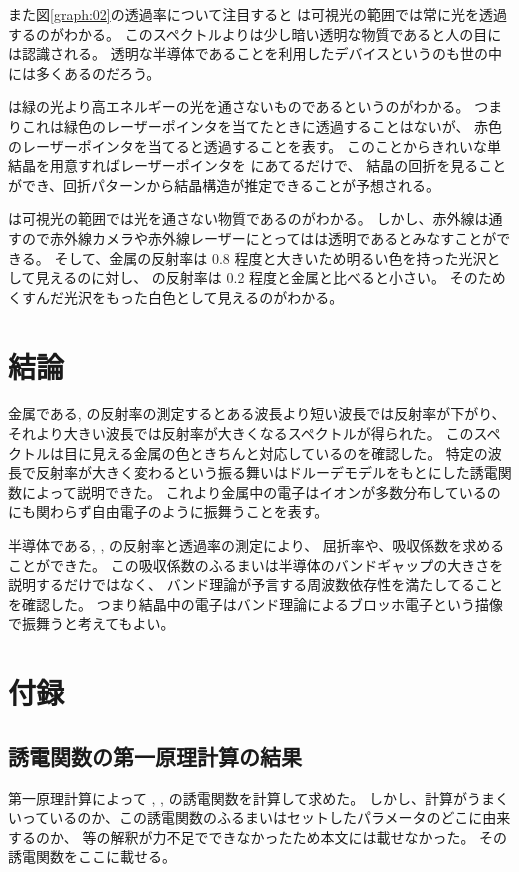 \documentclass[11pt,dvipdfmx,a4paper]{jsarticle}
\begin{document}
また図\ref{graph:02}の透過率について注目すると
は可視光の範囲では常に光を透過するのがわかる。
このスペクトルよりは少し暗い透明な物質であると人の目には認識される。
透明な半導体であることを利用したデバイスというのも世の中には多くあるのだろう。

 は緑の光より高エネルギーの光を通さないものであるというのがわかる。
つまりこれは緑色のレーザーポインタを当てたときに透過することはないが、
赤色のレーザーポインタを当てると透過することを表す。
このことからきれいな単結晶を用意すればレーザーポインタを  にあてるだけで、
結晶の回折を見ることができ、回折パターンから結晶構造が推定できることが予想される。

 は可視光の範囲では光を通さない物質であるのがわかる。
しかし、赤外線は通すので赤外線カメラや赤外線レーザーにとってはは透明であるとみなすことができる。
そして、金属の反射率は 0.8 程度と大きいため明るい色を持った光沢として見えるのに対し、
 の反射率は 0.2 程度と金属と比べると小さい。
そのためくすんだ光沢をもった白色として見えるのがわかる。

\section{結論}
金属である,  の反射率の測定するとある波長より短い波長では反射率が下がり、
それより大きい波長では反射率が大きくなるスペクトルが得られた。
このスペクトルは目に見える金属の色ときちんと対応しているのを確認した。
特定の波長で反射率が大きく変わるという振る舞いはドルーデモデルをもとにした誘電関数によって説明できた。
これより金属中の電子はイオンが多数分布しているのにも関わらず自由電子のように振舞うことを表す。

半導体である, ,  の反射率と透過率の測定により、
屈折率や、吸収係数を求めることができた。
この吸収係数のふるまいは半導体のバンドギャップの大きさを説明するだけではなく、
バンド理論が予言する周波数依存性を満たしてることを確認した。
つまり結晶中の電子はバンド理論によるブロッホ電子という描像で振舞うと考えてもよい。




\section*{付録}
\subsection*{誘電関数の第一原理計算の結果}
第一原理計算によって , ,  の誘電関数を計算して求めた。
しかし、計算がうまくいっているのか、この誘電関数のふるまいはセットしたパラメータのどこに由来するのか、
等の解釈が力不足でできなかったため本文には載せなかった。
その誘電関数をここに載せる。
\end{document}
